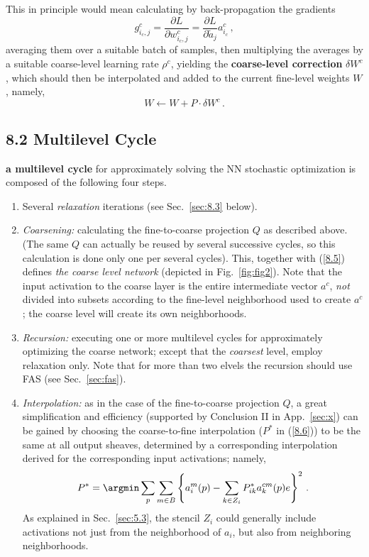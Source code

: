 \documentclass{article} %
\begin{document}
This in principle would mean calculating by back-propagation the gradients
\begin{equation}
	g^c_{i_c,j} = \frac{\partial L}{\partial w^c_{i_c,j}} =
	\frac{\partial L}{\partial \tilde{a}_j} a^c_{i_c}\,,
	\label{gc}
\end{equation}
averaging them over a suitable batch of samples, then multiplying the averages by a suitable coarse-level learning rate $\rho^c$, yielding the \textbf{coarse-level correction} $\delta W^c$, which should then be interpolated and added to the current fine-level weights $W$, namely,
\begin{equation}
	W \longleftarrow W + P \cdot \delta W^c\,.
	\label{w_correction}
\end{equation}

\subsection{8.2 Multilevel Cycle}
\label{sec:multilevel_cycle}
{\bf a multilevel cycle} for approximately solving the NN stochastic optimization is composed of the following four steps.
\begin{enumerate}
    \item Several {\it relaxation} iterations (see Sec.~\ref{sec:8.3} below).
    \item {\it Coarsening:} calculating the fine-to-coarse projection $Q$ as described above. (The same $Q$ can actually be reused by several successive cycles, so this calculation is done only one per several cycles). This, together with (\ref{8.5}) defines {\it the coarse level network} (depicted in Fig.~\ref{fig:fig2}). Note that the input activation to the coarse layer is the entire intermediate vector $a^c$, {\it not} divided into subsets according to the fine-level neighborhood used to create $a^c$; the coarse level will create its own neighborhoods.
    \item {\it Recursion:} executing one or more multilevel cycles for approximately optimizing the coarse network; except that the {\it coarsest} level, employ relaxation only. Note that for more than two elvels the recursion should use FAS (see Sec.~\ref{sec:fas}).
    \item {\it Interpolation:} as in the case of the fine-to-coarse projection $Q$, a great simplification and efficiency (supported by Conclusion II in App.~\ref{sec:x}) can be gained by choosing the coarse-to-fine interpolation ($P^*$ in (\ref{8.6})) to be the same at all output sheaves, determined by a corresponding interpolation derived for the corresponding input activations; namely,
    \begin{equation}
        P^* = \argmin \sum_p \sum_{m \in B} \left\{ a^m_i(p) - \sum_{k \in Z_i} P^*_{ik} a^{cm}_k(p)e\right\}^2\,.
        \label{pstar_fit}
    \end{equation}
    As explained in Sec.~\ref{sec:5.3}, the stencil $Z_i$ could generally include activations not just from the neighborhood of $a_i$, but also from neighboring neighborhoods.
\end{enumerate}
\end{document}
